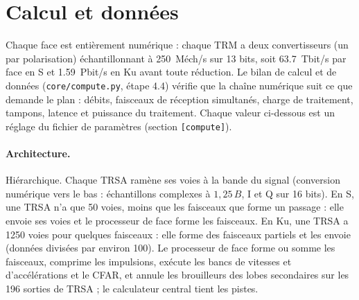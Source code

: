 \documentclass[11pt,a4paper]{article}
\newcommand{\code}[1]{\texttt{\small #1}}
\begin{document}
\section{Calcul et données}\label{sec:compute}
Chaque face est entièrement numérique : chaque TRM a deux convertisseurs (un par polarisation) échantillonnant à
\SI{250}{Méch/s} sur 13 bits, soit \SI{63.7}{Tbit/s} par face en S et \SI{1.59}{Pbit/s} en Ku avant toute réduction.
Le bilan de calcul et de données (\code{core/compute.py}, étape 4.4) vérifie que la chaîne numérique suit ce que demande
le plan : débits, faisceaux de réception simultanés, charge de traitement, tampons, latence et puissance du traitement.
Chaque valeur ci-dessous est un réglage du fichier de paramètres (section \code{[compute]}).

\paragraph{Architecture.} Hiérarchique. Chaque TRSA ramène ses voies à la bande du signal (conversion numérique vers
le bas : échantillons complexes à $1,25\,B$, I et Q sur 16 bits). En S, une TRSA n'a que 50 voies, moins que les
faisceaux que forme un passage : elle envoie ses voies et le processeur de face forme les faisceaux. En Ku, une TRSA a
\num{1250} voies pour quelques faisceaux : elle forme des faisceaux partiels et les envoie (données divisées par environ
100). Le processeur de face forme ou somme les faisceaux, comprime les impulsions, exécute les bancs de vitesses et
d'accélérations et le CFAR, et annule les brouilleurs des lobes secondaires sur les 196 sorties de TRSA ; le calculateur
central tient les pistes.
\end{document}
